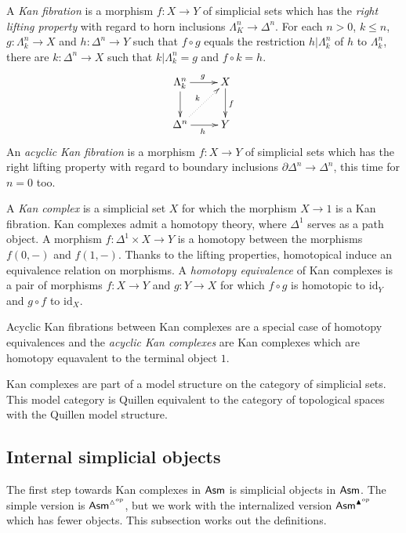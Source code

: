 \documentclass{amsart}
\theoremstyle{plain}
\theoremstyle{definition}
\newcommand\hide[1]{}
\newcommand\id{\mathrm{id}}
\begin{document}
A \emph{Kan fibration} is a morphism $f:X\to Y$ of simplicial sets which has the \emph{right lifting property} with regard to horn inclusions $\Lambda^n_K\to\Delta^n$. For each $n>0$, $k\leq n$, $g:\Lambda^n_k\to X$ and $h:\Delta^n \to Y$ such that $f\circ g$ equals the restriction $h|\Lambda^n_k$ of $h$ to $\Lambda^n_k$, there are $k:\Delta^n\to X$ such that $k|\Lambda^n_k = g$ and $f\circ k = h$.
\[ \xymatrix{
\Lambda^n_k \ar[d] \ar[r]^g & X\ar[d]^f\\
\Delta^n \ar[r]_h\ar@{.>}[ur]^k & Y
}\]
An \emph{acyclic Kan fibration} is a morphism $f:X\to Y$ of simplicial sets which has the right lifting property with regard to boundary inclusions $\partial \Delta^n\to\Delta^n$, this time for $n=0$ too. 

A \emph{Kan complex} is a simplicial set $X$ for which the morphism $X\to 1$ is a Kan fibration. Kan complexes admit a homotopy theory, where $\Delta^1$ serves as a path object. A morphism $f:\Delta^1\times X\to Y$ is a homotopy between the morphisms $f(0,-)$ and $f(1,-)$. Thanks to the lifting properties, homotopical induce an equivalence relation on morphisms. A \emph{homotopy equivalence} of Kan complexes is a pair of morphisms $f:X\to Y$ and $g:Y\to X$ for which $f\circ g$ is homotopic to $\id_Y$ and $g\circ f$ to $\id_X$. 

Acyclic Kan fibrations between Kan complexes are a special case of homotopy equivalences and the \emph{acyclic Kan complexes} are Kan complexes which are homotopy equavalent to the terminal object $1$.%

Kan complexes are part of a model structure on the category of simplicial sets. This model category is Quillen equivalent to the category of topological spaces with the Quillen model structure. \hide{cite: Hovey, Goerss Jardine, etc.?}

\subsection{Internal simplicial objects}
The first step towards Kan complexes in $\mathsf{Asm}$ is simplicial objects in $\mathsf{Asm}$. The simple version is $\mathsf{Asm}^{\vartriangle^{op}}$, but we work with the internalized version $\mathsf{Asm}^{\blacktriangle^{op}}$ which has fewer objects. This subsection works out the definitions. \hide{alles beschreven in M\&M, citeren dus}
\end{document}
